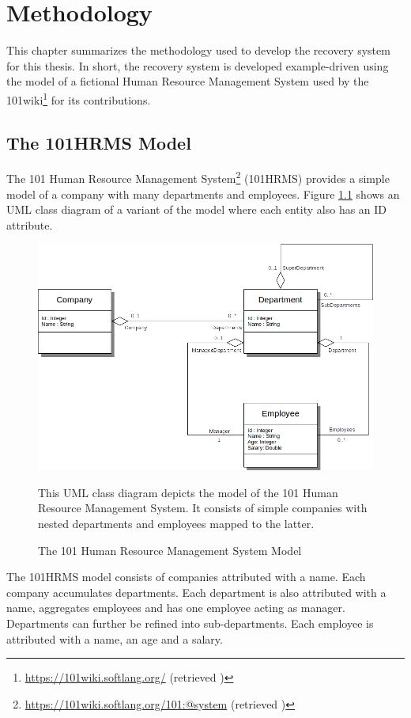 \chapter{Methodology}
This chapter summarizes the methodology used to develop the recovery system for this thesis.
In short, the recovery system is developed example-driven using the model of a fictional Human Resource Management System used by the 101wiki\footnote{\url{https://101wiki.softlang.org/} (retrieved )} for its contributions.

\section{The 101HRMS Model}
The 101 Human Resource Management System\footnote{\url{https://101wiki.softlang.org/101:@system} (retrieved )} (101HRMS) provides a simple model of a company with many departments and employees.
Figure \ref{figure:101HRMSModel} shows an UML class diagram of a variant of the model where each entity also has an ID attribute.

\begin{figure}[h!]
\begin{center}
\includegraphics[scale=.5]{images/101HRMSModel.png}
\end{center}
{
\scriptsize 
This UML class diagram depicts the model of the 101 Human Resource Management System.
It consists of simple companies with nested departments and employees mapped to the latter.
}
\caption{The 101 Human Resource Management System Model}
\label{figure:101HRMSModel}
\end{figure}

The 101HRMS model consists of companies attributed with a name.
Each company accumulates departments.
Each department is also attributed with a name, aggregates employees and has one employee acting as manager.
Departments can further be refined into sub-departments.
Each employee is attributed with a name, an age and a salary.

